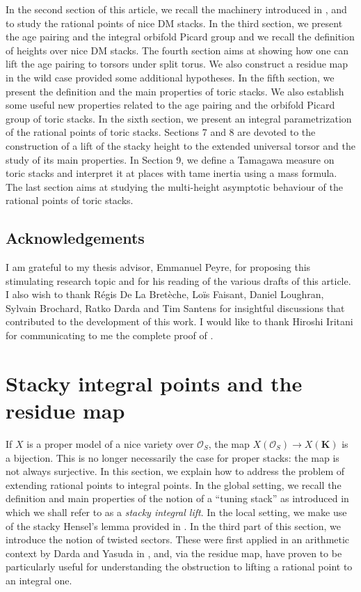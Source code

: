 \documentclass{proc-l}
\newcommand{\K}{\mathbf{K}}
\newcommand{\sheafO}{\mathcal{O}}
\theoremstyle{definition}
\theoremstyle{remark}
\numberwithin{equation}{section}
\begin{document}
In the second section of this article, we recall the machinery introduced in \cite{ellenberg2022heights}, \cite{darda2024batyrevmanin} and \cite{loughran_santens_malle_conjecture} to study the rational points of nice DM stacks. In the third section, we present the age pairing and the integral orbifold Picard group and we recall the definition of heights over nice DM stacks. The fourth section aims at showing how one can lift the age pairing to torsors under split torus. We also construct a residue map in the wild case provided some additional hypotheses. In the fifth section, we present the definition and the main properties of toric stacks. We also establish some useful new properties related to the age pairing and the orbifold Picard group of toric stacks. In the sixth section, we present an integral parametrization of the rational points of toric stacks. Sections 7 and 8 are devoted to the construction of a lift of the stacky height to the extended universal torsor and the study of its main properties. In Section 9, we define a Tamagawa measure on toric stacks and interpret it at places with tame inertia using a mass formula. The last section aims at studying the multi-height asymptotic behaviour of the rational points of toric stacks.

\subsection{Acknowledgements}

I am grateful to my thesis advisor, Emmanuel Peyre, for proposing this stimulating research topic and for his reading of the various drafts of this article. I also wish to thank Régis De La Bretèche, Loïs Faisant, Daniel Loughran, Sylvain Brochard, Ratko Darda and Tim Santens for insightful discussions that contributed to the development of this work. I would like to thank Hiroshi Iritani for communicating to me the complete proof of \cite[Proposition 21]{Coates_Corti_Iritani_Tseng_miror_theorem_toric_stack}.


\section{Stacky integral points and the residue map}



If $X$ is a proper model of a nice variety over $\sheafO_S$, the map $ X(\sheafO_S) \rightarrow X(\K) $ is a bijection. This is no longer necessarily the case for proper stacks: the map is not always surjective. In this section, we explain how to address the problem of extending rational points to integral points. In the global setting, we recall the definition and main properties of the notion of a ``tuning stack'' as introduced in \cite{ellenberg2022heights} which we shall refer to as a \textit{stacky integral lift}. In the local setting, we make use of the stacky Hensel’s lemma provided in \cite{loughran_santens_malle_conjecture}. In the third part of this section, we introduce the notion of twisted sectors. These were first applied in an arithmetic context by Darda and Yasuda in \cite{darda2024batyrevmanin}, and, via the residue map, have proven to be particularly useful for understanding the obstruction to lifting a rational point to an integral one.
\end{document}
